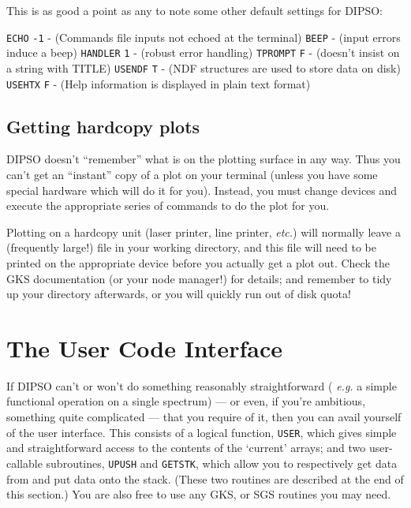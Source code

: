 \documentclass[twoside,11pt]{article}
\newcommand{\htmlref}[2]{#1}
\renewcommand{\_}{\texttt{\symbol{95}}}
\begin{document}
This is as good a point as any to note some other default settings for
DIPSO:

\htmlref{{\tt{ECHO}}}{COM:ECHO}  {\tt{-1}}  - (Commands file inputs not echoed at the terminal) \newline
\htmlref{{\tt{BEEP}}}{COM:BEEP}  - (input errors induce a beep) \newline
\htmlref{{\tt{HANDLER}}}{COM:HANDLER}  {\tt{1}}  - (robust error handling) \newline
\htmlref{{\tt{TPROMPT}}}{COM:TPROMPT}  {\tt{F}}  - (doesn't insist on a string with TITLE) \newline
\htmlref{{\tt{USENDF}}}{COM:USENDF}  {\tt{T}}  - (NDF structures are used to store data on disk) \newline
\htmlref{{\tt{USEHTX}}}{COM:USEHTX}  {\tt{F}}  - (Help information is displayed in  plain text format) \newline

\subsection {Getting hardcopy plots}

DIPSO doesn't ``remember'' what is on the plotting surface in any way.
Thus you can't get an ``instant'' copy of a plot on your terminal
(unless you have some special hardware which will do it for you).
Instead, you must change devices and execute the appropriate series
of commands to do the plot for you.

Plotting on a hardcopy unit (laser printer, line printer, {\em etc.})
will normally leave a (frequently large!) file in your working
directory, and this file will need to be printed on the appropriate
device before you actually get a plot out. Check the GKS documentation
(or your node manager!) for details; and remember to tidy up your
directory afterwards, or you will quickly run out of disk quota!

\section {The User Code Interface}

If DIPSO can't or won't do something reasonably straightforward ({\em
e.g.} a simple functional operation on a single spectrum) --- or even,
if you're ambitious, something quite complicated --- that you
require of it, then you can avail yourself of the user interface. This
consists of a logical function, {\tt{USER}},  which gives simple and
straightforward access to the contents of the `current' arrays; and
two user-callable subroutines, {\tt{UPUSH}}  and {\tt{GETSTK}},  which
allow you to respectively get data from and put data onto the stack.
(These two routines are described at the end of this section.) You are
also free to use any GKS, or SGS routines you may need.
\end{document}
